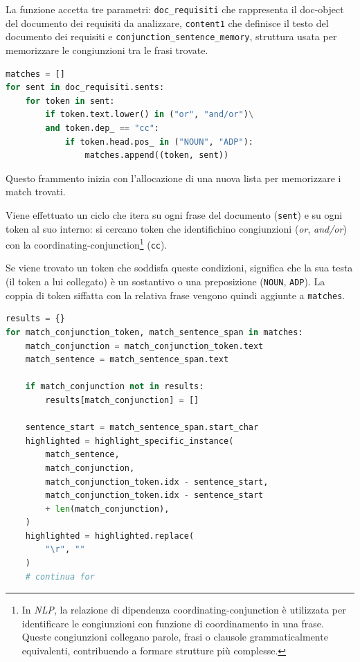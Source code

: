 \documentclass[12pt]{report}
\newcommand{\nlp}{\textsl{NLP}\xspace}
\begin{document}
\noindent La funzione accetta tre parametri: \texttt{doc\_requisiti} che rappresenta il doc-object del documento dei requisiti da analizzare, \texttt{content1} che definisce il testo del documento dei requisiti e \texttt{conjunction\_sentence\_memory}, struttura usata per memorizzare le congiunzioni tra le frasi trovate.


\begin{mdframed}
\small
\begin{lstlisting}[language=Python]
matches = []
for sent in doc_requisiti.sents:
    for token in sent:
        if token.text.lower() in ("or", "and/or")\
        and token.dep_ == "cc":
            if token.head.pos_ in ("NOUN", "ADP"):
                matches.append((token, sent))
\end{lstlisting}
\end{mdframed}

\noindent Questo frammento inizia con l'allocazione di una nuova lista per memorizzare i match trovati.

Viene effettuato un ciclo che itera su ogni frase del documento (\texttt{sent}) e su ogni token al suo interno: si cercano token che identifichino congiunzioni (\textit{or}, \textit{and/or}) con la coordinating-conjunction\footnote{In \nlp , la relazione di dipendenza coordinating-conjunction è utilizzata per identificare le congiunzioni con funzione di coordinamento in una frase. Queste congiunzioni collegano parole, frasi o clausole grammaticalmente equivalenti, contribuendo a formare strutture più complesse.} (\texttt{cc}).

Se viene trovato un token che soddisfa queste condizioni, significa che la sua testa (il token a lui collegato) è un sostantivo o una preposizione (\texttt{NOUN}, \texttt{ADP}). La coppia di token siffatta con la relativa frase vengono quindi aggiunte a \texttt{matches}.


\begin{mdframed}
\small
\begin{lstlisting}[language=Python]
results = {}
for match_conjunction_token, match_sentence_span in matches:
    match_conjunction = match_conjunction_token.text
    match_sentence = match_sentence_span.text

    if match_conjunction not in results:
        results[match_conjunction] = []

    sentence_start = match_sentence_span.start_char
    highlighted = highlight_specific_instance(
        match_sentence,
        match_conjunction,
        match_conjunction_token.idx - sentence_start,
        match_conjunction_token.idx - sentence_start
        + len(match_conjunction),
    )
    highlighted = highlighted.replace(
        "\r", ""
    )
    # continua for
\end{lstlisting}
\end{mdframed}
\end{document}
